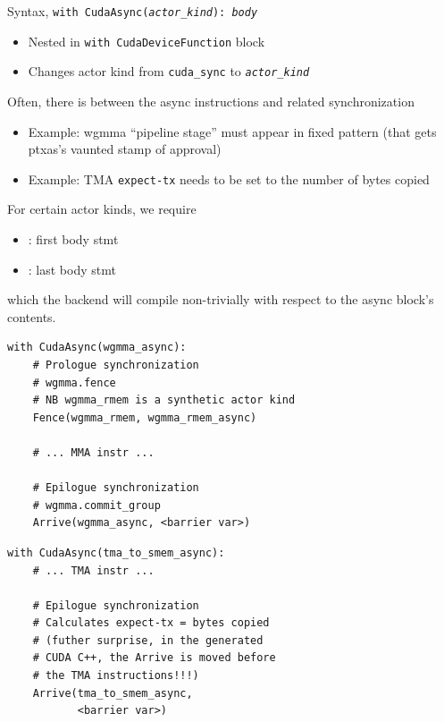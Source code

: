 \begin{minipage}[t]{0.48\textwidth}\fixminipage

Syntax, \texttt{with CudaAsync(\textit{actor\_kind}): \textit{body}}

\begin{itemize}
  \item Nested in \texttt{with CudaDeviceFunction} block
  \item Changes actor kind from \texttt{cuda\_sync} to \texttt{\textit{actor\_kind}}
\end{itemize}
Often, there is  between the async instructions and related synchronization
\begin{itemize}
\item Example: wgmma ``pipeline stage'' must appear in fixed pattern (that gets ptxas's vaunted stamp of approval)
\item Example: TMA \texttt{expect-tx} needs to be set to the number of bytes copied
\end{itemize}
\vspace{12mm}
For certain actor kinds, we  require
\begin{itemize}
\item {}: first body stmt
\item {}: last body stmt
\end{itemize}
which the backend will compile non-trivially with respect to the async block's contents.

\end{minipage}
\hfill
\begin{minipage}[t]{0.48\textwidth}\fixminipage
{}
\begin{verbatim}
with CudaAsync(wgmma_async):
    # Prologue synchronization
    # wgmma.fence
    # NB wgmma_rmem is a synthetic actor kind
    Fence(wgmma_rmem, wgmma_rmem_async)

    # ... MMA instr ...

    # Epilogue synchronization
    # wgmma.commit_group
    Arrive(wgmma_async, <barrier var>)
\end{verbatim}
\begin{verbatim}
with CudaAsync(tma_to_smem_async):
    # ... TMA instr ...

    # Epilogue synchronization
    # Calculates expect-tx = bytes copied
    # (futher surprise, in the generated
    # CUDA C++, the Arrive is moved before
    # the TMA instructions!!!)
    Arrive(tma_to_smem_async,
           <barrier var>)
\end{verbatim}
\end{minipage}

